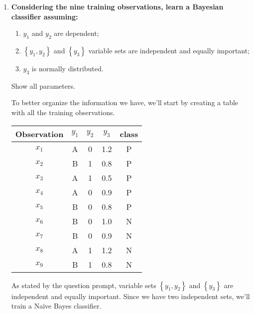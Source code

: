 \documentclass[12pt]{article}
\begin{document}
\begin{enumerate}[leftmargin=\labelsep,resume]
    \item {\bfseries Considering the nine training observations, learn a Bayesian classifier assuming:
          \begin{enumerate}[label=(\roman*)]
              \item \(y_1\) and \(y_2\) are dependent;
              \item \(\left\{y_1, y_2\right\}\) and \(\left\{y_3\right\}\) variable sets
                    are independent and equally important;
              \item \(y_3\) is normally distributed.
          \end{enumerate}
          Show all parameters.
          }

          To better organize the information we have, we'll start by creating a table
          with all the training observations.

          \begin{center}
              \begin{tabular}{c|cccc}
                  Observation & \(y_1\) & \(y_2\) & \(y_3\) & class \\
                  \hline
                  \(x_1\)     & A       & 0       & 1.2     & P     \\
                  \(x_2\)     & B       & 1       & 0.8     & P     \\
                  \(x_3\)     & A       & 1       & 0.5     & P     \\
                  \(x_4\)     & A       & 0       & 0.9     & P     \\
                  \(x_5\)     & B       & 0       & 0.8     & P     \\
                  \(x_6\)     & B       & 0       & 1.0     & N     \\
                  \(x_7\)     & B       & 0       & 0.9     & N     \\
                  \(x_8\)     & A       & 1       & 1.2     & N     \\
                  \(x_9\)     & B       & 1       & 0.8     & N
              \end{tabular}
          \end{center}

          As stated by the question prompt, variable sets \(\left\{y_1, y_2\right\}\)
          and \(\left\{y_3\right\}\) are independent and equally important.
          Since we have two independent sets, we'll train a Naïve Bayes classifier.


\end{enumerate}
\end{document}
